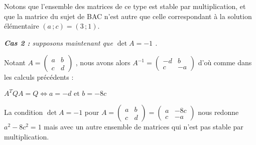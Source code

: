 \medskip

Notons que l'ensemble des matrices de ce type est stable par multiplication, et que la matrice du sujet de BAC n'est autre que celle correspondant à la solution élémentaire
$(a \,; c) = (3 \,; 1)$.




\bigskip

\textit{\textbf{Cas 2 :} supposons maintenant que $\det A = -1$ .}

\medskip

Notant
$A = \begin{pmatrix} 
  a & b \\ 
  c & d
\end{pmatrix}$ ,
nous avons alors
$A^{-1} = \begin{pmatrix} 
  -d & b  \\ 
   c & -a
\end{pmatrix}$
d'où comme dans les calculs précédents :

\medskip

$A^T Q A = Q \Longleftrightarrow a = -d \text{ et } b = -8c$


\bigskip

La condition $\det A = -1$ pour
$A
=
\begin{pmatrix} 
  a & b \\ 
  c & d
\end{pmatrix}
=
\begin{pmatrix} 
  a & -8c \\ 
  c & -a
\end{pmatrix}$
nous redonne
$a^2 - 8c^2 = 1$ mais avec un autre ensemble de matrices qui n'est pas stable par multiplication.

